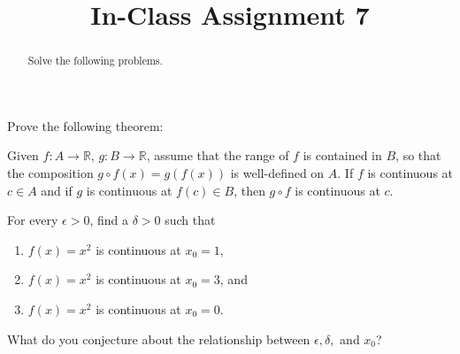 \documentclass{ximera}
\begin{document}
    \title{In-Class Assignment 7}
    \begin{abstract} Solve the following problems. \end{abstract}
    \maketitle

\begin{exercise}
    Prove the following theorem:
    \begin{theorem}
    Given $f:A \to \mathbb{R}$, $g:B\to \mathbb{R}$, assume that the range of $f$ is contained in $B$, so that the composition $g \circ f(x)= g(f(x))$ is well-defined on $A$.  If $f$ is continuous at $c\in A$ and if $g$ is continuous at $f(c)\in B$, then $g \circ f$ is continuous at $c$.
\end{theorem}
\end{exercise}
\newpage 
\begin{exercise}
 For every $\epsilon > 0$, find a $\delta >0$ such that
 \begin{enumerate}
     \item $f(x)= x^2$ is continuous at $x_0=1$,
     \item $f(x) = x^2$ is continuous at $x_0 = 3$, and
     \item $f(x) = x^2$ is continuous at $x_0 = 0$.
 \end{enumerate}
 What do you conjecture about the relationship between $\epsilon, \delta,$ and $x_0$?
\end{exercise}
\end{document}
